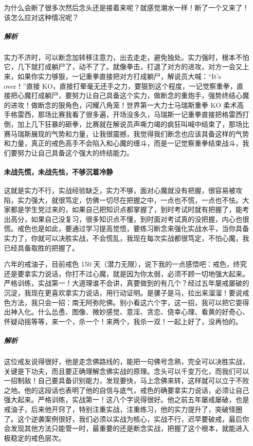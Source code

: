 \begin{case}[实战中的问题]
    为什么会断了很多次然后念头还是接着来呢？就感觉潮水一样！断了一个又来了！该怎么应对这种情况呢？
    \subparagraph{解析} 实力不济时，可以断念加转移注意力，出去走走，避免独处。实力强时，根本不怕它，几下就打成躺尸了，动不了了。就像拳击，打退了对方的进攻，对方一会又上来，如果你实力够狠，一记重拳直接把对方打成躺尸，解说员大喊：“It's over！”直接 KO，直接打晕毫无还手之力，要狠到这个程度，一记觉察重拳，直接把心魔打成躺尸，要努力让自己具备这个实力，做断念的重炮手，强势终结心魔的进攻！做断念的狠角色，闪耀八角笼！世界第一大力士马瑞斯重拳 KO 柔术高手格雷西，那场比赛我看了很多遍，开场没多久，马瑞斯一记重拳直接把格雷西打倒，加上几下狂暴的砸拳，比赛就在解说员声嘶力竭的疯狂叫喊中结束了，那场比赛马瑞斯展现的气势和力量，让我很震撼，我觉得我们断念也应该具备这样的气势和力量，真正的戒色高手不会陷入和心魔的缠斗，而是一记觉察重拳结束战斗，我们要努力让自己具备这个强大的终结能力。
\end{case}

\paragraph{未战先慌，未战先怯，不够沉着冷静}

这就是实力不行，实战经验缺乏，实力不够，面对心魔就没有把握，很容易被攻陷，实力强大，就很笃定，仿佛一切尽在把握之中，一点也不慌，一点也不怯。大家都是学生党过来的，如果自己把知识点都掌握了，到时考试时就有把握了，能考出高分，如果自己没复习，很多知识点不懂，到时面对考试真的没把握，内心也很慌。戒色也是如此，要通过学习提高觉悟，要练习断念来强化实战水平，当你具备实力了，你就可以决胜实战，不会慌乱，我现在每次实战都很笃定，不怕心魔，我已经具备取胜的把握了。

\begin{case}
    六年的戒油子，目前戒色 150 天（潜力无限），说下我的一点感悟吧：戒色，终究还是要拿实力说话，你打不过心魔，就是因为你太弱，必须不顾一切地强大起来。严格训练，实战第一！大道理谁不会讲，真要做到的有几个？经过五年屡戒屡破的沉淀，我现在更喜欢拿实力说话，用行动证明。是骡子是马，拉出来溜溜！要说戒色方法，我只会一招：南无阿弥陀佛。别小看这六个字，这一招，我可以把它耍得出神入化。什么怂恿、图像、微妙感觉、意淫、贪恋、侥幸心理、看黄的好奇心、怀疑动摇等等，来一个，杀一个！来两个，我杀一双！一起上好了，没再怕的。
    \subparagraph{解析} 这位戒友说得很好，他是走念佛路线的，能把一句佛号念熟，完全可以决胜实战，关键是下功夫，而且要正确理解念佛实战的原理。念头可以千变万化，而我们可以一招制敌！自己要具备识别能力，发现要快，马上念佛来转，这样就可以立于不败之地。他的这段话也表明了他的自信与底气，戒色的确要拿实力说话，必须让自己强大起来。严格训练，实战第一！这八个字说得很好。他之前五年屡戒屡破，也是戒油子，后来他开窍了，特别注重实战，注重练习，他的实力提升了，突破怪圈了。这个逆袭案例很好，我们必须以实战为核心，实战不行，迟早要破戒，最后你会发现其他方法只能管一时，最重要的还是断念实战，把握了这个根本，就能进入极稳定的戒色层次。
\end{case}

